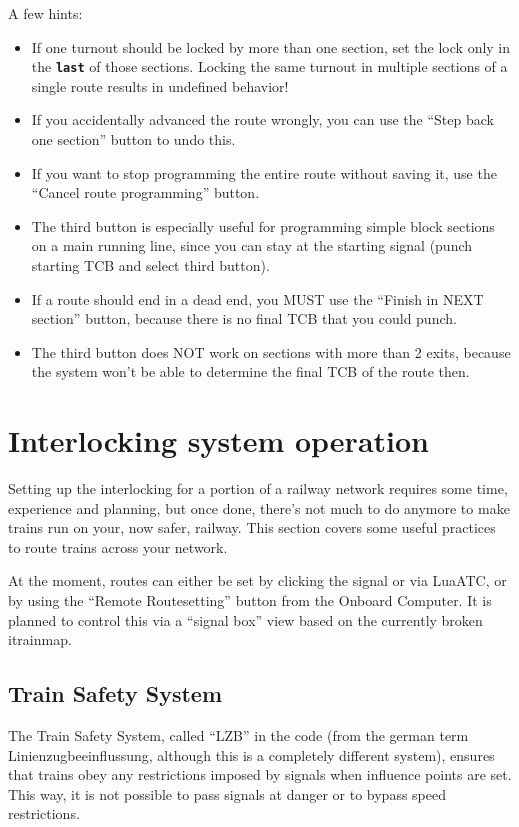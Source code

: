 \documentclass[english]{paper}
\begin{document}
A few hints:
\begin{itemize}
\item If one turnout should be locked by more than one section, set the
lock only in the \texttt{\textbf{last}} of those sections. Locking
the same turnout in multiple sections of a single route results in
undefined behavior!
\item If you accidentally advanced the route wrongly, you can use the ``Step
back one section'' button to undo this.
\item If you want to stop programming the entire route without saving it,
use the ``Cancel route programming'' button.
\item The third button is especially useful for programming simple block
sections on a main running line, since you can stay at the starting
signal (punch starting TCB and select third button).
\item If a route should end in a dead end, you MUST use the ``Finish in
NEXT section'' button, because there is no final TCB that you could
punch.
\item The third button does NOT work on sections with more than 2 exits,
because the system won't be able to determine the final TCB of the
route then.
\end{itemize}

\section{Interlocking system operation}

Setting up the interlocking for a portion of a railway network requires
some time, experience and planning, but once done, there's not much
to do anymore to make trains run on your, now safer, railway. This
section covers some useful practices to route trains across your network.

At the moment, routes can either be set by clicking the signal or
via LuaATC, or by using the ``Remote Routesetting'' button from
the Onboard Computer. It is planned to control this via a ``signal
box'' view based on the currently broken itrainmap.

\subsection{Train Safety System}

The Train Safety System, called ``LZB'' in the code (from the german
term Linienzugbeeinflussung, although this is a completely different
system), ensures that trains obey any restrictions imposed by signals
when influence points are set. This way, it is not possible to pass
signals at danger or to bypass speed restrictions.
\end{document}
